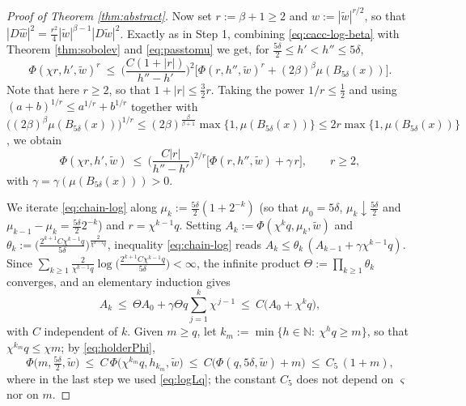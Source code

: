 \documentclass[reqno]{amsart}
\theoremstyle{plain}
\theoremstyle{definition}
\theoremstyle{remark}
\newcommand{\N}{\mathbb{N}}
\begin{document}
\begin{proof}[Proof of Theorem \ref{thm:abstract}]
Now set $r:=\beta+1\ge2$ and $\widehat w:=|\widetilde w|^{r/2}$, so that
$|D\widehat w|^2=\frac{r^2}{4}|\widetilde w|^{\beta-1}|D\widetilde w|^2$. Exactly as in Step 1,
combining \eqref{eq:cacc-log-beta} with Theorem \ref{thm:sobolev} and \eqref{eq:passtomu} we get,
for $\frac{5\delta}{2}\le h'<h''\le5\delta$,
\[
\Phi(\chi r,h',\widetilde w)^{r}\ \le\ \Big(\frac{C(1+|r|)}{h''-h'}\Big)^{2}
\Big[\Phi(r,h'',\widetilde w)^{r}+(2\beta)^{\beta}\mu(B_{5\delta}(x))\Big] .
\]
Note that here $r\ge2$, so that $1+|r|\le\frac32 r$.
Taking the power $1/r\le\frac12$ and using $(a+b)^{1/r}\le a^{1/r}+b^{1/r}$ together with
$\big((2\beta)^{\beta}\mu(B_{5\delta}(x))\big)^{1/r}\le(2\beta)^{\frac{\beta}{\beta+1}}\max\{1,\mu(B_{5\delta}(x))\}
\le 2r\max\{1,\mu(B_{5\delta}(x))\}$, we obtain
\begin{equation}\label{eq:chain-log}
\Phi(\chi r,h',\widetilde w)\ \le\ \Big(\frac{C|r|}{h''-h'}\Big)^{2/r}
\Big[\Phi(r,h'',\widetilde w)+\gamma\,r\Big],\qquad r\ge2 ,
\end{equation}
with $\gamma=\gamma(\mu(B_{5\delta}(x)))>0$.

We iterate \eqref{eq:chain-log} along $\mu_k:=\frac{5\delta}{2}(1+2^{-k})$ (so that
$\mu_0=5\delta$, $\mu_k\downarrow\frac{5\delta}{2}$ and $\mu_{k-1}-\mu_k=\frac{5\delta}{2}2^{-k}$)
and $r=\chi^{k-1}q$. Setting $A_k:=\Phi(\chi^{k}q,\mu_k,\widetilde w)$ and
$\theta_k:=\big(\tfrac{2^{k+1}C\chi^{k-1}q}{5\delta}\big)^{\frac{2}{\chi^{k-1}q}}$, inequality
\eqref{eq:chain-log} reads $A_k\le\theta_k\,(A_{k-1}+\gamma\chi^{k-1}q)$. Since
$\sum_{k\ge1}\frac{2}{\chi^{k-1}q}\log\big(\tfrac{2^{k+1}C\chi^{k-1}q}{5\delta}\big)<\infty$, the
infinite product $\Theta:=\prod_{k\ge1}\theta_k$ converges, and an elementary induction gives
\[
A_k\ \le\ \Theta A_0+\gamma\Theta q\sum_{j=1}^{k}\chi^{\,j-1}\ \le\ C\big(A_0+\chi^{k}q\big) ,
\]
with $C$ independent of $k$. Given $m\ge q$, let $k_m:=\min\{h\in\N:\ \chi^{h}q\ge m\}$, so that
$\chi^{k_m}q\le\chi m$; by \eqref{eq:holderPhi},
\begin{equation}\label{eq:momentbound}
\Phi\big(m,\tfrac{5\delta}{2},\widetilde w\big)\ \le\
C\,\Phi\big(\chi^{k_m}q,h_{k_m},\widetilde w\big)\ \le\ C\big(\Phi(q,5\delta,\widetilde w)+m\big)
\ \le\ C_5\,(1+m),
\end{equation}
where in the last step we used \eqref{eq:logLq}; the constant $C_5$ does not depend on $\varsigma$
nor on $m$.


\end{proof}
\end{document}
